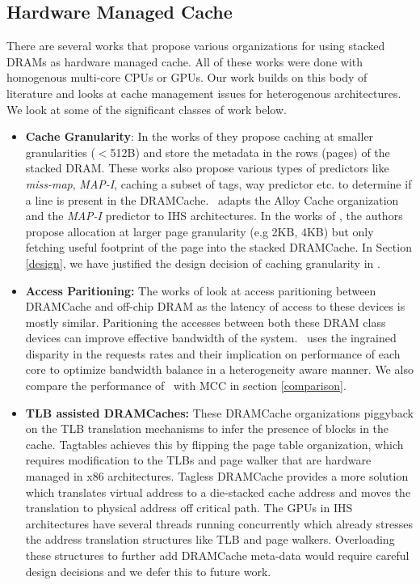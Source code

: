 \subsection{Hardware Managed Cache}
There are several works that propose various organizations for using stacked DRAMs as hardware managed cache. All of these works were done with homogenous multi-core CPUs or GPUs. Our work builds on this body of literature and looks at cache management issues for heterogenous architectures. We look at some of the significant classes of work below.
\begin{itemize}
\item \textbf{Cache Granularity}: In the works of \cite{loh-hill,alloy,atcache,bimodal} they propose caching at smaller granularities ($<$512B) and store the metadata in the rows (pages) of the stacked DRAM. These works also propose various types of predictors like \textit{miss-map}, \textit{MAP-I}, caching a subset of tags, way predictor etc. to determine if a line is present in the DRAMCache. \cachename\ adapts the Alloy Cache organization and the \textit{MAP-I} predictor to IHS architectures. In the works of \cite{footprint}, the authors propose allocation at larger page granularity (e.g 2KB, 4KB) but only fetching useful footprint of the page into the stacked DRAMCache. In Section \ref{design}, we have justified the design decision of caching granularity in \cachename.

\item \textbf{Access Paritioning:} The works of \cite{mostly-clean,mainak-hpca,micro-refresh,bear} look at access paritioning between DRAMCache and off-chip DRAM as the latency of access to these devices is mostly similar. Paritioning the accesses between both these DRAM class devices can improve effective bandwidth of the system. \cachename\ uses the ingrained disparity in the requests rates and their implication on performance of each core to optimize bandwidth balance in a heterogeneity aware manner. We also compare the performance of \cachename\ with MCC \cite{mostly-clean} in section \ref{comparison}.

\item \textbf{TLB assisted DRAMCaches:} These DRAMCache organizations piggyback on the TLB translation mechanisms to infer the presence of blocks in the cache. Tagtables \cite{tag-tables} achieves this by flipping the page table organization, which requires modification to the TLBs and page walker that are hardware managed in x86 architectures. Tagless DRAMCache \cite{tagless-dramcache} provides a more solution which translates virtual address to a die-stacked cache address and moves the translation to physical address off critical path. The GPUs in IHS architectures have several threads running concurrently which already stresses the address translation structures like TLB and page walkers. Overloading these structures to further add DRAMCache meta-data would require careful design decisions and we defer this to future work.

\end{itemize}
